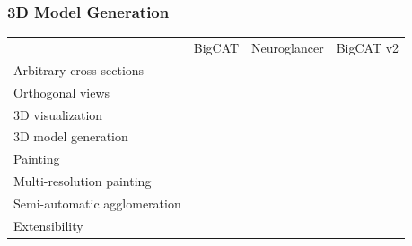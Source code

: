 \documentclass[aspectratio=169,table]{beamer}
\newcommand{\cmark}{\ding{51}}%
\newcommand{\xmark}{\ding{55}}%
\newcommand{\gcmark}{{\color{green}\cmark}}%
\newcommand{\ycmark}{{\color{yellow}\cmark}}%
\newcommand{\rxmark}{{\color{red}\xmark}}%
\begin{document}

\begin{frame}
    \frametitle{3D Model Generation}
    \small
    \vspace{1cm}
    \begin{table}
        \centering
        \begin{tabular}{lccc}
                                       & BigCAT & Neuroglancer & BigCAT v2 \\
          Arbitrary cross-sections     & \gcmark & \gcmark & \gcmark \\
          Orthogonal views             & \rxmark & \gcmark & \gcmark \\ 
          3D visualization             & \rxmark & \gcmark & \gcmark \\ 
          \rowcolor{black!20}  3D model generation          & \rxmark & \rxmark & \gcmark \\ 
          Painting                     & \gcmark & \rxmark & \gcmark \\ 
          Multi-resolution painting         & \rxmark & \rxmark & \gcmark \\ 
          Semi-automatic agglomeration & \rxmark & \rxmark & \gcmark \\ 
          Extensibility                & \rxmark & \ycmark & \gcmark \\
        \end{tabular}
    \end{table}
\end{frame}


\end{document}
